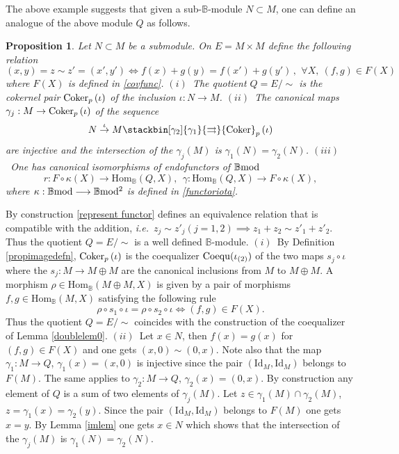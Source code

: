 \documentclass[12pt]{article}
\newtheorem{prop}[thm]{Proposition}
\def\Hom{{\rm Hom}}
\def\id{{\rm id}}
\def\Cpr{{\rm Coker}_p\,}
\def\coequ{{\rm Coequ}}
\def\B{{\mathbb B}}
\def\qqq{\,,\,~\forall}
\newcommand{\ie}{{\it i.e.\/}\ }
\def\id{{\mbox{Id}}}
\def\Hom {{\mbox{Hom}}}
\def\bmod{{\rm \B mod}}
\def\bm2{{\rm \B mod^2}}
\begin{document}
The above example suggests that  given a sub-$\B$-module $N\subset M$, one can define an analogue of the above module $Q$ as follows. 
\begin{prop}\label{cokerneldef} Let $N\subset M$ be a submodule. On $E=M\times M$ define the following relation 
\begin{equation}\label{represent functor}
(x,y)=z\sim z'=(x',y')\iff f(x)+g(y)=f(x')+g(y')\qqq X, \ (f,g)\in F(X)	
\end{equation}
where $F(X)$ is defined in \eqref{covfunc}. \newline 
$(i)$~The quotient $Q=E/\!\!\sim$ is the cokernel pair $\Cpr(\iota)$  of the inclusion  $\iota:N\to M$.\newline
$(ii)$~The canonical maps $\gamma_j:M\to \Cpr(\iota)$ of the sequence \begin{equation}\label{defncokerused}
	N\stackrel{\iota}{\to} M \stackbin[\gamma_2]{\gamma_1}{\rightrightarrows}\Cpr(\iota)\end{equation}
	are injective and the intersection of the $\gamma_j(M)$ is $\gamma_1(N)=\gamma_2(N)$.\newline
$(iii)$~One has   canonical isomorphisms of endofunctors  of $\bmod$
$$r:F\circ \kappa(X)\to \Hom_\B(Q,X), \  \  \gamma:\Hom_\B(Q,X)\to F\circ \kappa(X),$$
where $\kappa:\bmod\longrightarrow \bm2$ is defined in \eqref{functoriota}.
\end{prop}
\proof By construction \eqref{represent functor} defines an equivalence relation that is compatible with the addition, \ie $z_j\sim z'_j (j=1,2)\implies z_1+z_2\sim z'_1+z'_2$. Thus the quotient $Q=E/\!\!\sim$ is a well defined $\B$-module. \newline
$(i)$~By Definition \ref{propimagedefn}, $\Cpr(\iota)$ is the coequalizer $\coequ (\iota_{(2)})$ of the two maps $s_j\circ \iota$ where the $s_j:M\to M\oplus M$ are the canonical inclusions from $M$ to $M\oplus M$. A morphism $\rho\in \Hom_\B(M\oplus M,X)$ is given by a pair of morphisms $f,g\in \Hom_\B(M,X)$ satisfying the following rule
$$
\rho \circ s_1\circ \iota=\rho \circ s_2\circ \iota\iff (f,g)\in F(X).
$$
Thus the quotient $Q=E/\!\!\sim$ coincides with the construction of the coequalizer of Lemma \ref{doublelem0}. \newline
$(ii)$~Let $x\in N$, then $f(x)=g(x)$ for $(f,g)\in F(X)$ and one gets $(x,0)\sim (0,x)$. Note also that the map $\gamma_1:M\to Q$,
$\gamma_1(x)=(x,0)$ is injective since the pair $(\id_M,\id_M)$ belongs to $F(M)$. The same applies to $\gamma_2:M\to Q$,
$\gamma_2(x)=(0,x)$. By construction any element of $Q$ is a sum of two elements of $\gamma_j(M)$. Let $z\in \gamma_1(M)\cap \gamma_2(M)$, $z=\gamma_1(x)=\gamma_2(y)$. Since the pair $(\id_M,\id_M)$ belongs to $F(M)$ one gets $x=y$. By Lemma \ref{imlem} one gets $x\in N$ which shows that the intersection of the $\gamma_j(M)$ is $\gamma_1(N)=\gamma_2(N)$.\newline  
\end{document}
